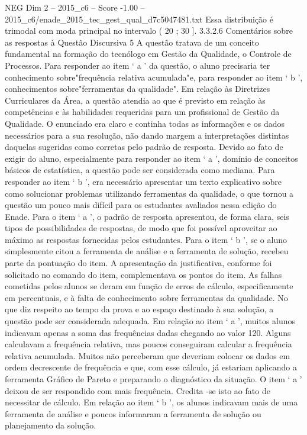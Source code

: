 \begin{textsample}{NEG Dim 2 – 2015\_c6 – Score -1.00 – 2015\_c6/enade\_2015\_tec\_gest\_qual\_d7c5047481.txt}
Essa distribuição é trimodal com moda principal no intervalo ( 20 ; 30 ]. 3.3.2.6 Comentários sobre as respostas à Questão Discursiva 5 A questão tratava de um conceito fundamental na formação do tecnólogo em Gestão da Qualidade, o Controle de Processos.
Para responder ao item ‘ a ’ da questão, o aluno precisaria ter conhecimento sobre"frequência relativa acumulada"e, para responder ao item ‘ b ’, conhecimentos sobre"ferramentas da qualidade".
Em relação às Diretrizes Curriculares da Área, a questão atendia ao que é previsto em relação às competências e às habilidades requeridas para um profissional de Gestão da Qualidade.
O enunciado era claro e continha todas as informações e os dados necessários para a sua resolução, não dando margem a interpretações distintas daquelas sugeridas como corretas pelo padrão de resposta.
Devido ao fato de exigir do aluno, especialmente para responder ao item ‘ a ’, domínio de conceitos básicos de estatística, a questão pode ser considerada como mediana.
Para responder ao item ‘ b ’, era necessário apresentar um texto explicativo sobre como solucionar problemas utilizando ferramentas da qualidade, o que tornou a questão um pouco mais difícil para os estudantes avaliados nessa edição do Enade.
Para o item ‘ a ’, o padrão de resposta apresentou, de forma clara, seis tipos de possibilidades de respostas, de modo que foi possível aproveitar ao máximo as respostas fornecidas pelos estudantes.
Para o item ‘ b ’, se o aluno simplesmente citou a ferramenta de análise e a ferramenta de solução, recebeu parte da pontuação do item.
A apresentação da justificativa, conforme foi solicitado no comando do item, complementava os pontos do item.
As falhas cometidas pelos alunos se deram em função de erros de cálculo, especificamente em percentuais, e à falta de conhecimento sobre ferramentas da qualidade.
No que diz respeito ao tempo da prova e ao espaço destinado à sua solução, a questão pode ser considerada adequada.
Em relação ao item ‘ a ’, muitos alunos indicavam apenas a soma das frequências dadas chegando ao valor 120.
Alguns calculavam a frequência relativa, mas poucos conseguiram calcular a frequência relativa acumulada.
Muitos não perceberam que deveriam colocar os dados em ordem decrescente de frequência e que, com esse cálculo, já estariam aplicando a ferramenta Gráfico de Pareto e preparando o diagnóstico da situação.
O item ‘ a ’ deixou de ser respondido com mais frequência.
Credita -se isto ao fato de necessitar de cálculo.
Em relação ao item ‘ b ’, os alunos indicavam mais de uma ferramenta de análise e poucos informaram a ferramenta de solução ou planejamento da solução.

\end{textsample}
